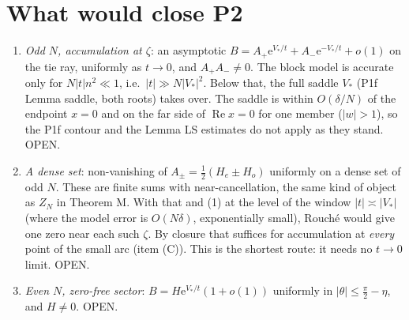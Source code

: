 \documentclass[11pt]{article}
\theoremstyle{remark}\newtheorem{remark}[theorem]{Remark}
\newcommand{\e}{\mathrm{e}}
\begin{document}
\section{What would close P2}
\begin{enumerate}
\item \emph{Odd $N$, accumulation at $\zeta$}: an asymptotic $B=A_+\e^{V_*/t}+A_-\e^{-V_*/t}+o(1)$ on the tie ray, uniformly as $t\to0$, and $A_+A_-\ne0$.
The block model is accurate only for $N|t|n^2\ll1$, i.e.\ $|t|\gg N|V_*|^2$. Below that, the full saddle $V_*$ (P1f Lemma saddle, both
roots) takes over. The saddle is within $O(\delta/N)$ of the endpoint $x=0$ and on the far side of $\operatorname{Re}x=0$ for one member
($|w|>1$), so the P1f contour and the Lemma LS estimates do not apply as they stand. OPEN.
\item \emph{A dense set}: non-vanishing of $A_\pm=\frac12(H_e\pm H_o)$ uniformly on a dense set of odd $N$. These are finite
sums with near-cancellation, the same kind of object as $Z_N$ in Theorem M. With that and (1) at the level of the window $|t|\asymp|V_*|$
(where the model error is $O(N\delta)$, exponentially small), Rouch\'e would give one zero near each such $\zeta$. By closure that suffices
for accumulation at \emph{every} point of the small arc (item (C)). This is the shortest route: it needs no $t\to0$ limit. OPEN.
\item \emph{Even $N$, zero-free sector}: $B=H\e^{V_*/t}(1+o(1))$ uniformly in $|\theta|\le\frac\pi2-\eta$, and $H\ne0$. OPEN.
\end{enumerate}
\end{document}
